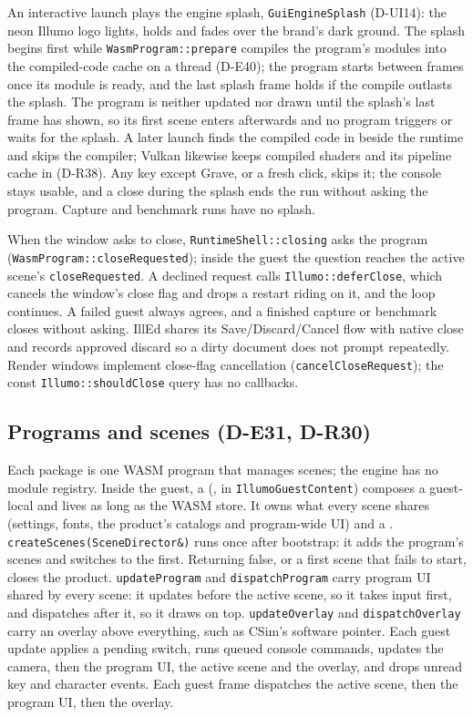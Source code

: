 An interactive launch plays the engine splash, \texttt{GuiEngineSplash}
(D-UI14): the neon Illumo logo lights, holds and fades over the brand's dark
ground. The splash begins first while \texttt{WasmProgram::prepare} compiles
the program's modules into the compiled-code cache on a thread (D-E40); the
program starts between frames once its module is ready, and the last splash
frame holds if the compile outlasts the splash. The program is neither updated
nor drawn until the splash's last frame has shown, so its first scene enters
afterwards and no program triggers or waits for the splash. A later launch
finds the compiled code in  beside the runtime and skips
the compiler; Vulkan likewise keeps compiled shaders and its pipeline cache in
 (D-R38). Any key except Grave, or a fresh
click, skips it; the console stays usable, and a close during the splash ends
the run without asking the program. Capture and benchmark runs have no splash.

When the window asks to close, \texttt{RuntimeShell::closing} asks the program
(\texttt{WasmProgram::closeRequested}); inside the guest the question reaches
the active scene's \texttt{closeRequested}. A declined request calls
\texttt{Illumo::deferClose}, which cancels the window's close flag and drops a
restart riding on it, and the loop continues. A failed guest always agrees, and
a finished capture or benchmark closes without asking. IllEd shares its
Save/Discard/Cancel flow with native close and records approved discard so a
dirty document does not prompt repeatedly. Render windows implement close-flag
cancellation (\texttt{cancelCloseRequest}); the const
\texttt{Illumo::shouldClose} query has no callbacks.

\subsection{Programs and scenes (D-E31, D-R30)}
\label{sec:runtime-programs}
Each package is one WASM program that manages scenes; the engine has no module
registry. Inside the guest, a 
(, in
\texttt{IllumoGuestContent}) composes a guest-local 
and lives as long as the WASM store. It owns what every scene shares
(settings, fonts, the product's catalogs and program-wide UI) and a
. \texttt{createScenes(SceneDirector\&)} runs once
after bootstrap: it adds the program's scenes and switches to the first.
Returning false, or a first scene that fails to start, closes the product.
\texttt{updateProgram} and \texttt{dispatchProgram} carry program UI shared by
every scene: it updates before the active scene, so it takes input first, and
dispatches after it, so it draws on top. \texttt{updateOverlay} and
\texttt{dispatchOverlay} carry an overlay above everything, such as CSim's
software pointer. Each guest update applies a pending switch, runs queued
console commands, updates the camera, then the program UI, the active scene
and the overlay, and drops unread key and character events. Each guest frame
dispatches the active scene, then the program UI, then the overlay.


